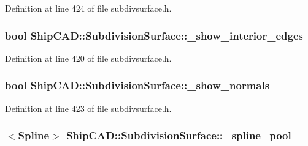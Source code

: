 Definition at line 424 of file subdivsurface.\+h.

\subsubsection[{\texorpdfstring{\+\_\+show\+\_\+interior\+\_\+edges}{_show_interior_edges}}]{\setlength{\rightskip}{0pt plus 5cm}bool Ship\+C\+A\+D\+::\+Subdivision\+Surface\+::\+\_\+show\+\_\+interior\+\_\+edges\hspace{0.3cm}{\ttfamily [protected]}}\hypertarget{classShipCAD_1_1SubdivisionSurface_a4458d02152bd97495938586c89e6d9e2}{}\label{classShipCAD_1_1SubdivisionSurface_a4458d02152bd97495938586c89e6d9e2}


Definition at line 420 of file subdivsurface.\+h.

\subsubsection[{\texorpdfstring{\+\_\+show\+\_\+normals}{_show_normals}}]{\setlength{\rightskip}{0pt plus 5cm}bool Ship\+C\+A\+D\+::\+Subdivision\+Surface\+::\+\_\+show\+\_\+normals\hspace{0.3cm}{\ttfamily [protected]}}\hypertarget{classShipCAD_1_1SubdivisionSurface_a0cc840743e7afcd136ab864ace158a17}{}\label{classShipCAD_1_1SubdivisionSurface_a0cc840743e7afcd136ab864ace158a17}


Definition at line 423 of file subdivsurface.\+h.

\subsubsection[{\texorpdfstring{\+\_\+spline\+\_\+pool}{_spline_pool}}]{$<${\bf Spline}$>$ Ship\+C\+A\+D\+::\+Subdivision\+Surface\+::\+\_\+spline\+\_\+pool\hspace{0.3cm}{\ttfamily [protected]}}\hypertarget{classShipCAD_1_1SubdivisionSurface_acfa427b1b9a8582382fcb2a7de95553f}{}\label{classShipCAD_1_1SubdivisionSurface_acfa427b1b9a8582382fcb2a7de95553f}


